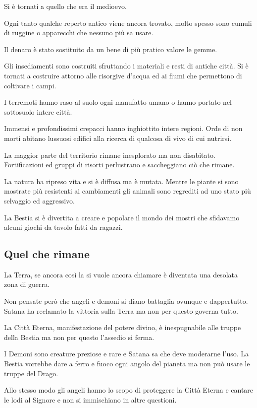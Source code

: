 \documentclass[12pt,a4paper,twoside,openany]{book}
\begin{document}
\begin{multicols}{2}
Si è tornati a quello che era il medioevo.

Ogni tanto qualche reperto antico viene ancora trovato, molto spesso sono cumuli di ruggine o apparecchi che nessuno più sa usare.

Il denaro è stato sostituito da un bene di più pratico valore le gemme.

Gli insediamenti sono costruiti sfruttando i materiali e resti di antiche città. Si è tornati a costruire attorno alle risorgive d'acqua ed ai fiumi che permettono di coltivare i campi.

I terremoti hanno raso al suolo ogni manufatto umano o hanno portato nel sottosuolo intere città.

Immensi e profondissimi crepacci hanno inghiottito intere regioni. Orde di non morti abitano lussuosi edifici alla ricerca di qualcosa di vivo di cui nutrirsi.

La maggior parte del territorio rimane inesplorato ma non disabitato. Fortificazioni ed gruppi di risorti perlustrano e saccheggiano ciò che rimane.

La natura ha ripreso vita e si è diffusa ma è mutata. Mentre le piante si sono mostrate più resistenti ai cambiamenti gli animali sono regrediti ad uno stato più selvaggio ed aggressivo.

La Bestia si è divertita a creare e popolare il mondo dei mostri che sfidavamo alcuni giochi da tavolo fatti da ragazzi.

\subsection{Quel che rimane}

La Terra, se ancora così la si vuole ancora chiamare è diventata una desolata zona di guerra.

Non pensate però che angeli e demoni si diano battaglia ovunque e dappertutto. Satana ha reclamato la vittoria sulla Terra ma non per questo governa tutto.

La Città Eterna, manifestazione del potere divino, è inespugnabile alle truppe della Bestia ma non per questo l'assedio si ferma.

I Demoni sono creature preziose e rare e Satana sa che deve moderarne l'uso. La Bestia vorrebbe dare a ferro e fuoco ogni angolo del pianeta ma non può usare le truppe del Drago.

Allo stesso modo gli angeli hanno lo scopo di proteggere la Città Eterna e cantare le lodi al Signore e non si immischiano in altre questioni.


\end{multicols}
\end{document}
